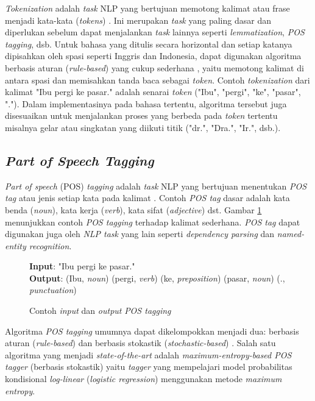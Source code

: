 \textit{Tokenization} adalah \textit{task} NLP yang bertujuan memotong kalimat atau frase menjadi kata-kata (\textit{tokens}) \citep{manning2008introduction}. Ini merupakan \textit{task} yang paling dasar dan diperlukan sebelum dapat menjalankan \textit{task} lainnya seperti \textit{lemmatization}, \textit{POS tagging}, dsb. Untuk bahasa yang ditulis secara horizontal dan setiap katanya dipisahkan oleh spasi seperti Inggris dan Indonesia, dapat digunakan algoritma berbasis aturan (\textit{rule-based}) yang cukup sederhana \citep{manningptbtokenizer}, yaitu memotong kalimat di antara spasi dan memisahkan tanda baca sebagai \textit{token}. Contoh \textit{tokenization} dari kalimat "Ibu pergi ke pasar." adalah senarai \textit{token} ("Ibu", "pergi", "ke", "pasar", "."). Dalam implementasinya pada bahasa tertentu, algoritma tersebut juga disesuaikan untuk menjalankan proses yang berbeda pada \textit{token} tertentu misalnya gelar atau singkatan yang diikuti titik ("dr.", "Dra.", "Ir.", dsb.).

\subsection{\textit{Part of Speech Tagging}}

\textit{Part of speech} (POS) \textit{tagging} adalah \textit{task} NLP yang bertujuan menentukan \textit{POS tag} atau jenis setiap kata pada kalimat \citep{jurafsky2000speech}. Contoh \textit{POS tag} dasar adalah kata benda (\textit{noun}), kata kerja (\textit{verb}), kata sifat (\textit{adjective}) dst. Gambar \ref{fig:example_pos_tagging} menunjukkan contoh \textit{POS tagging} terhadap kalimat sederhana. \textit{POS tag} dapat digunakan juga oleh \textit{NLP task} yang lain seperti \textit{dependency parsing} dan \textit{named-entity recognition}.

\begin{figure}
	\begin{mdframed}
		\textbf{Input}: "Ibu pergi ke pasar." \\		
		\textbf{Output}: (Ibu, \textit{noun}) (pergi, \textit{verb}) (ke, \textit{preposition}) (pasar, \textit{noun}) (., \textit{punctuation})
	\end{mdframed}
	\caption{Contoh \textit{input} dan \textit{output} \textit{POS tagging}}
	\label{fig:example_pos_tagging}
\end{figure}

Algoritma \textit{POS tagging} umumnya dapat dikelompokkan menjadi dua: berbasis aturan (\textit{rule-based}) dan berbasis stokastik (\textit{stochastic-based}) \citep{jurafsky2000speech}. Salah satu algoritma yang menjadi \textit{state-of-the-art} adalah \textit{maximum-entropy-based POS tagger} (berbasis stokastik) yaitu \textit{tagger} yang mempelajari model probabilitas kondisional \textit{log-linear} (\textit{logistic regression}) menggunakan metode \textit{maximum entropy}.

